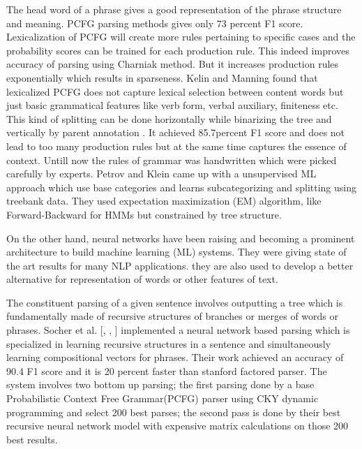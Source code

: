 \documentclass[a4paper, 11pt]{article}
\begin{document}
The head word of a phrase gives a good representation of the phrase structure and meaning. 
PCFG parsing methods gives only 73 percent F1 score. Lexicalization of PCFG will create more rules pertaining to specific cases and the probability scores can be trained for each production rule. This indeed improves accuracy of parsing using Charniak method. But it increases production rules exponentially which results in sparseness. Kelin and Manning found that lexicalized PCFG does not capture lexical selection between content words but just basic grammatical features like verb form, verbal auxiliary, finiteness etc. This kind of splitting can be done horizontally while binarizing the tree and vertically by parent annotation \parencite{Gaddy2018}. It achieved 85.7percent F1 score and does not lead to too many production rules but at the same time captures the essence of context. Untill now the rules of grammar was handwritten which were picked carefully by experts. Petrov and Klein came up with a unsupervised ML approach which use base categories and learns subcategorizing and splitting using treebank data. They used expectation maximization (EM) algorithm, like Forward-Backward for HMMs but constrained by tree structure. 

On the other hand, neural networks have been raising and becoming a prominent architecture to build machine learning (ML) systems. They were giving state of the art results for many NLP applications. they are also used to develop a better alternative for representation of words or other features of text. 

The constituent parsing of a given sentence involves outputting a tree which is fundamentally made of recursive structures of branches or merges of words or phrases. Socher et al. [\parencite*{RichardSocher2011}, \parencite*{Socher}, \parencite*{Sochera}] implemented a neural network based parsing which is specialized in learning recursive structures in a sentence and simultaneously learning compositional vectors for phrases. Their work achieved an accuracy of 90.4 F1 score and it is 20 percent faster than stanford factored parser. The system involves two bottom up parsing; the first parsing done by a base Probabilistic Context Free Grammar(PCFG) parser using CKY dynamic programming and select 200 best parses; the second pass is done by their best recursive neural network model with expensive matrix calculations on those 200 best results. 

\end{document}

